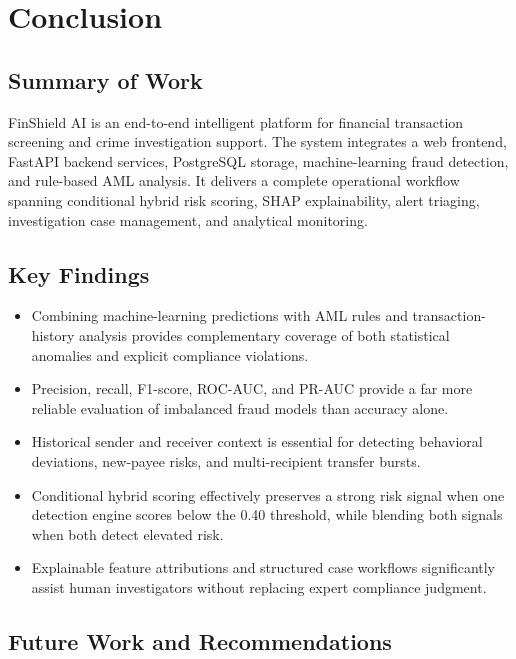 \documentclass{tietreport}
\begin{document}

\chapter{Conclusion}

\section{Summary of Work}

FinShield AI is an end-to-end intelligent platform for financial
transaction screening and crime investigation support. The system
integrates a web frontend, FastAPI backend services, PostgreSQL storage,
machine-learning fraud detection, and rule-based AML analysis. It
delivers a complete operational workflow spanning conditional hybrid risk
scoring, SHAP explainability, alert triaging, investigation case
management, and analytical monitoring.

\section{Key Findings}

\begin{itemize}
  \item Combining machine-learning predictions with AML rules and
  transaction-history analysis provides complementary coverage of both
  statistical anomalies and explicit compliance violations.
  \item Precision, recall, F1-score, ROC-AUC, and PR-AUC provide a far
  more reliable evaluation of imbalanced fraud models than accuracy alone.
  \item Historical sender and receiver context is essential for detecting
  behavioral deviations, new-payee risks, and multi-recipient transfer bursts.
  \item Conditional hybrid scoring effectively preserves a strong risk
  signal when one detection engine scores below the 0.40 threshold, while
  blending both signals when both detect elevated risk.
  \item Explainable feature attributions and structured case workflows
  significantly assist human investigators without replacing expert
  compliance judgment.
\end{itemize}

\section{Future Work and Recommendations}
\end{document}
